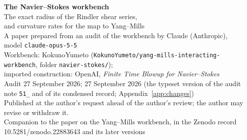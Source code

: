 


\thispagestyle{plain}
\begin{center}
{\LARGE\bfseries The Navier--Stokes workbench}\\[8pt]
{\Large The exact radius of the Rindler shear series,\\ and curvature rates for the map to Yang--Mills}\\[14pt]
{\large A paper prepared from an audit of the workbench by Claude (Anthropic),\\ model \texttt{claude-opus-5-5}}\\[8pt]
{\normalsize Workbench: KokunoYumeto (\texttt{KokunoYumeto/yang-mills-interacting-workbench}, folder \texttt{navier-stokes/});\\ imported construction: OpenAI, \emph{Finite Time Blowup for Navier--Stokes}}\\[4pt]
{\normalsize Audit 27 September 2026; 27 September 2026 (the typeset version of the audit note \texttt{51\_} and of its condensed record; Appendix~\ref{app:changes})}\\[4pt]
{\small Published at the author's request ahead of the author's review; the author may revise or withdraw it.}\\[2pt]
{\small Companion to the paper on the Yang--Mills workbench, in the Zenodo record 10.5281/zenodo.22883643 and its later versions}
\end{center}



\tableofcontents
\clearpage







\appendix



